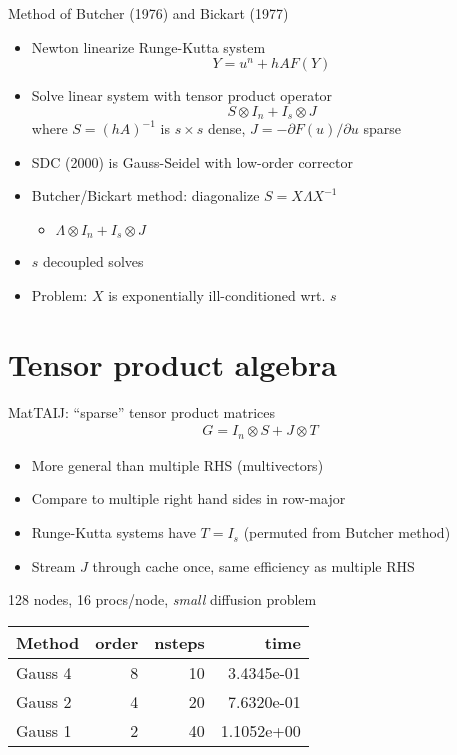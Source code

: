 \documentclass{beamer}
\begin{document}
\begin{frame}{Method of Butcher (1976) and Bickart (1977)}
  \begin{itemize}
  \item Newton linearize Runge-Kutta system
    \begin{equation*}
      Y = u^{n} + h A F(Y)
    \end{equation*}
  \item Solve linear system with tensor product operator
    \begin{equation*}
      S \otimes I_n + I_s \otimes J
    \end{equation*}
    where $S = (hA)^{-1}$ is $s\times s$ dense, $J = -\partial F(u)/\partial u$ sparse
  \item SDC (2000) is Gauss-Seidel with low-order corrector
  \item Butcher/Bickart method: diagonalize $S = X \Lambda X^{-1}$
    \begin{itemize}
    \item $\Lambda \otimes I_n + I_s \otimes J$
    \end{itemize}
  \item $s$ decoupled solves
  \item Problem: $X$ is exponentially ill-conditioned wrt. $s$
  \end{itemize}
\end{frame}

\section{Tensor product algebra}
\begin{frame}{MatTAIJ: ``sparse'' tensor product matrices}
  \begin{gather*}
    G = I_n \otimes S + J \otimes T
  \end{gather*}
  \begin{itemize}
  \item More general than multiple RHS (multivectors)
  \item Compare to multiple right hand sides in row-major
  \item Runge-Kutta systems have $T = I_s$ (permuted from Butcher method)
  \item Stream $J$ through cache once, same efficiency as multiple RHS
  \end{itemize}
\end{frame}

\begin{frame}
  128 nodes, 16 procs/node, \emph{small} diffusion problem
  \begin{tabular}{lrrr}
    \toprule
    Method & order & nsteps & time \\
    \midrule
    Gauss 4 & 8 & 10 & 3.4345e-01 \\
    Gauss 2 & 4 & 20 & 7.6320e-01 \\
    Gauss 1 & 2 & 40 & 1.1052e+00 \\
    \bottomrule
  \end{tabular}
\end{frame}
\end{document}
